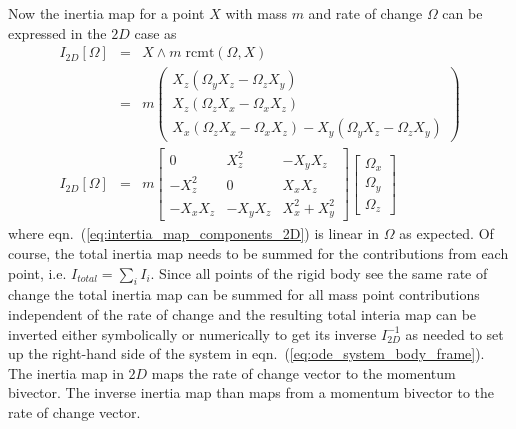 Now the inertia map for a point $X$ with mass $m$ and rate of change $\Omega$ can be
expressed in the $2D$ case as
\begin{eqnarray}
    I_{2D}[\Omega] &=& X \wedge m \; \mathrm{rcmt}(\Omega,X) \nonumber \\[10pt]
    &=& m 
    \begin{pmatrix}
        X_z (\Omega_y X_z - \Omega_z X_y) \\
        X_z (\Omega_z X_x - \Omega_x X_z) \\
        X_x (\Omega_z X_x - \Omega_x X_z) - X_y (\Omega_y X_z - \Omega_z X_y)
    \end{pmatrix} \nonumber \\[10pt]
    I_{2D}[\Omega] &=& m
    \begin{bmatrix}
        0        &  X_z^2   & -X_y X_z      \\
        -X_z^2   &  0       &  X_x X_z      \\
        -X_x X_z & -X_y X_z & X_x^2 + X_y^2
    \end{bmatrix}
    \begin{bmatrix}
        \Omega_x \\ \Omega_y \\ \Omega_z
    \end{bmatrix}
    \label{eq:intertia_map_components_2D}      
\end{eqnarray}
where eqn.~(\ref{eq:intertia_map_components_2D}) is linear in $\Omega$ as expected. Of
course, the total inertia map needs to be summed for the contributions from each point,
i.e. $I_{total} = \sum_i{I_i}$. Since all points of the rigid body see the same rate of
change the total inertia map can be summed for all mass point contributions independent of
the rate of change and the resulting total interia map can be inverted either symbolically
or numerically to get its inverse $I_{2D}^{-1}$ as needed to set up the right-hand side of
the system in eqn.~(\ref{eq:ode_system_body_frame}). The inertia map in $2D$ maps the rate
of change vector to the momentum bivector. The inverse inertia map than maps from a
momentum bivector to the rate of change vector. \\

\newpage

